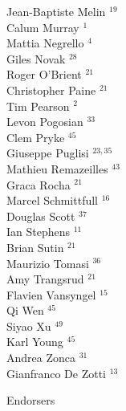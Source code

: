 \documentclass[PICOReport.tex]{subfiles}
\begin{document}
{\begin{multicols}{4}
Jean-Baptiste Melin $^{19}$             \\
Calum Murray $^{1}$                    \\
Mattia Negrello $^{4}$                 \\
Giles Novak $^{28}$                     \\
Roger O'Brient $^{21}$                  \\
Christopher Paine $^{21}$                     \\
Tim Pearson $^{2}$                     \\
Levon Pogosian $^{33}$                  \\
Clem Pryke $^{45}$                      \\
Giuseppe Puglisi $^{23,35}$                \\
Mathieu Remazeilles $^{43}$             \\
Graca Rocha $^{21}$                     \\
Marcel Schmittfull $^{16}$              \\
Douglas Scott $^{37}$                   \\
Ian Stephens $^{11}$                    \\
Brian Sutin $^{21}$                     \\
Maurizio Tomasi $^{36}$                 \\
Amy Trangsrud $^{21}$                   \\
Flavien Vansyngel $^{15}$               \\
Qi Wen $^{45}$                          \\
Siyao Xu $^{49}$                        \\
Karl Young $^{45}$                      \\
Andrea Zonca $^{31}$                    \\
Gianfranco De Zotti $^{13}$             
\end{multicols}
}

\Large { \centerline {Endorsers}}
\end{document}
